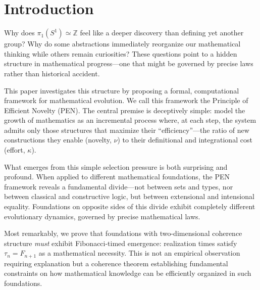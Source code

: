 \documentclass[11pt]{article}
\theoremstyle{definition}
\theoremstyle{remark}
\begin{document}
\begin{abstract}
This work establishes that the distinction between extensional and intensional equality---not
the choice between sets and types, or classical and constructive logic---fundamentally determines
what mathematical evolution is possible under efficiency optimization. The Complexity Scaling
Theorem provides the coherence theorem for dependent type theory with higher-dimensional
structure, joining classical results by Mac Lane, May, and Joyal-Street. Foundations with
one-dimensional equality structure cannot support sustained creativity; foundations with
two-dimensional equality structure exhibit unbounded growth following precise mathematical
laws, with the golden ratio emerging as the fundamental acceleration constant.
\end{abstract}

\tableofcontents

\section{Introduction}

Why does $\pi_1(S^1) \simeq \mathbb{Z}$ feel like a deeper discovery than defining yet another group? Why do some
abstractions immediately reorganize our mathematical thinking while others remain curiosities?
These questions point to a hidden structure in mathematical progress---one that might be governed
by precise laws rather than historical accident.

This paper investigates this structure by proposing a formal, computational framework for mathematical evolution. We call this framework the Principle of Efficient Novelty (PEN). The central
premise is deceptively simple: model the growth of mathematics as an incremental process where,
at each step, the system admits only those structures that maximize their ``efficiency''---the ratio of
new constructions they enable (novelty, $\nu$) to their definitional and integrational cost (effort, $\kappa$).

What emerges from this simple selection pressure is both surprising and profound. When applied to different mathematical foundations, the PEN framework reveals a fundamental divide---not
between sets and types, nor between classical and constructive logic, but between extensional and
intensional equality. Foundations on opposite sides of this divide exhibit completely different evolutionary dynamics, governed by precise mathematical laws.

Most remarkably, we prove that foundations with two-dimensional coherence structure \emph{must}
exhibit Fibonacci-timed emergence: realization times satisfy $\tau_n = F_{n+1}$ as a mathematical
necessity. This is not an empirical observation requiring explanation but a coherence theorem
establishing fundamental constraints on how mathematical knowledge can be efficiently organized
in such foundations.
\end{document}
